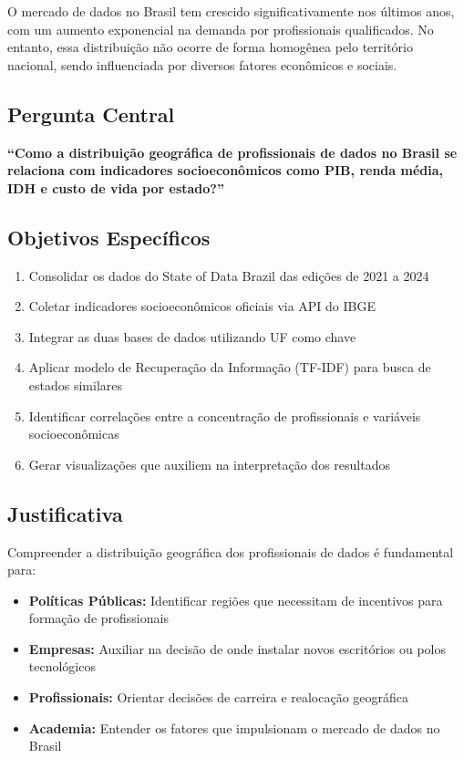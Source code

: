 \documentclass[
  11pt,
  letterpaper,
  DIV=11,
  numbers=noendperiod]{scrartcl}
\providecommand{\tightlist}{%
  \setlength{\itemsep}{0pt}\setlength{\parskip}{0pt}}
\begin{document}
O mercado de dados no Brasil tem crescido significativamente nos últimos
anos, com um aumento exponencial na demanda por profissionais
qualificados. No entanto, essa distribuição não ocorre de forma
homogênea pelo território nacional, sendo influenciada por diversos
fatores econômicos e sociais.

\subsection{Pergunta Central}\label{pergunta-central}

\textbf{``Como a distribuição geográfica de profissionais de dados no
Brasil se relaciona com indicadores socioeconômicos como PIB, renda
média, IDH e custo de vida por estado?''}

\subsection{Objetivos Específicos}\label{objetivos-especuxedficos}

\begin{enumerate}
\def\labelenumi{\arabic{enumi}.}
\tightlist
\item
  Consolidar os dados do State of Data Brazil das edições de 2021 a 2024
\item
  Coletar indicadores socioeconômicos oficiais via API do IBGE
\item
  Integrar as duas bases de dados utilizando UF como chave
\item
  Aplicar modelo de Recuperação da Informação (TF-IDF) para busca de
  estados similares
\item
  Identificar correlações entre a concentração de profissionais e
  variáveis socioeconômicas
\item
  Gerar visualizações que auxiliem na interpretação dos resultados
\end{enumerate}

\subsection{Justificativa}\label{justificativa}

Compreender a distribuição geográfica dos profissionais de dados é
fundamental para:

\begin{itemize}
\tightlist
\item
  \textbf{Políticas Públicas:} Identificar regiões que necessitam de
  incentivos para formação de profissionais
\item
  \textbf{Empresas:} Auxiliar na decisão de onde instalar novos
  escritórios ou polos tecnológicos
\item
  \textbf{Profissionais:} Orientar decisões de carreira e realocação
  geográfica
\item
  \textbf{Academia:} Entender os fatores que impulsionam o mercado de
  dados no Brasil
\end{itemize}
\end{document}
